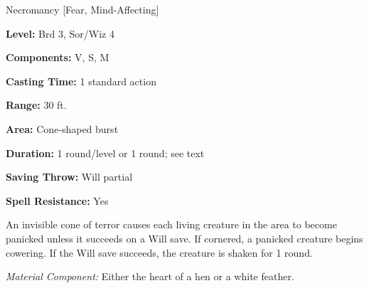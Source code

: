 
Necromancy [Fear, Mind-Affecting]

\textbf{Level:} Brd 3, Sor/Wiz 4

\textbf{Components:} V, S, M

\textbf{Casting Time:} 1 standard action

\textbf{Range:} 30 ft.

\textbf{Area:} Cone-shaped burst

\textbf{Duration:} 1 round/level or 1 round; see text

\textbf{Saving Throw:} Will partial

\textbf{Spell Resistance:} Yes

An invisible cone of terror causes each living creature in the area to become panicked 
unless it succeeds on a Will save. If cornered, a panicked creature begins cowering. 
If the Will save succeeds, the creature is shaken for 1 round.

\textit{Material Component:} Either the heart of a hen or a white feather.


